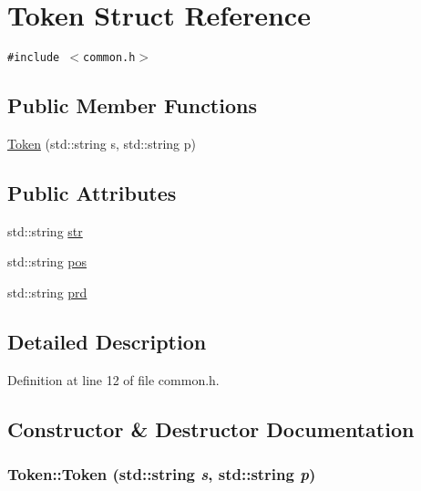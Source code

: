 \hypertarget{structToken}{
\section{Token Struct Reference}
\label{structToken}
}
{\tt \#include $<$common.h$>$}

\subsection*{Public Member Functions}
\begin{CompactItemize}
\item 
\hyperlink{structToken_ecb70597fbd9f23a0bbd01e881e7024c}{Token} (std::string s, std::string p)
\end{CompactItemize}
\subsection*{Public Attributes}
\begin{CompactItemize}
\item 
std::string \hyperlink{structToken_2b94b0c16e50e8a7db896fa3f26472a8}{str}
\item 
std::string \hyperlink{structToken_d0d56a715af7f550150d1e4503fd3f2b}{pos}
\item 
std::string \hyperlink{structToken_54f6054cbf612920cdf0ab80fee569cb}{prd}
\end{CompactItemize}


\subsection{Detailed Description}


Definition at line 12 of file common.h.

\subsection{Constructor \& Destructor Documentation}
\hypertarget{structToken_ecb70597fbd9f23a0bbd01e881e7024c}{
\subsubsection[{Token}]{\setlength{\rightskip}{0pt plus 5cm}Token::Token (std::string {\em s}, \/  std::string {\em p})}}
\label{structToken_ecb70597fbd9f23a0bbd01e881e7024c}




